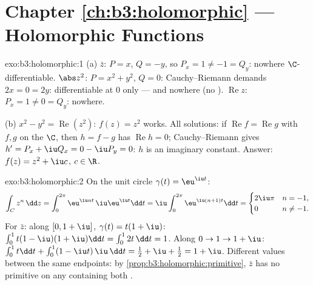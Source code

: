 \section*{Chapter \ref{ch:b3:holomorphic} --- Holomorphic
Functions}

\begin{solution}{exo:b3:holomorphic:1}
(a) $\bar z$: $P = x$, $Q = -y$, so $P_x = 1 \neq -1 = Q_y$:
nowhere $\C$-differentiable. $\abs z^2$: $P = x^2 + y^2$, $Q =
0$: Cauchy--Riemann demands $2x = 0 = 2y$: differentiable at
$0$ only --- and  nowhere (no ).
$\operatorname{Re}z$: $P_x = 1 \neq 0 = Q_y$: nowhere.

(b) $x^2 - y^2 = \operatorname{Re}(z^2)$: $f(z) = z^2$ works.
All solutions: if $\operatorname{Re}f = \operatorname{Re}g$
with $f, g$  on the  $\C$, then $h = f -
g$ has $\operatorname{Re}h = 0$; Cauchy--Riemann gives $h' =
P_x + \iu Q_x = 0 - \iu P_y = 0$: $h$ is an imaginary
constant. Answer: $f(z) = z^2 + \iu c$, $c \in \R$.
\end{solution}

\begin{solution}{exo:b3:holomorphic:2}
On the unit circle $\gamma(t) = \eu^{\iu t}$:
\[
\int_C z^n\,\dd z = \int_0^{2\pi}\eu^{\iu nt}\,\iu\eu^{\iu
t}\dd t = \iu\int_0^{2\pi}\eu^{\iu(n+1)t}\dd t
= \begin{cases} 2\iu\pi & n = -1,\\ 0 & n \neq -1.\end{cases}
\]
For $\bar z$: along $[0, 1+\iu]$, $\gamma(t) = t(1 + \iu)$:
$\int_0^1 t(1 - \iu)(1 + \iu)\dd t = \int_0^12t\,\dd t = 1$.
Along $0 \to 1 \to 1 + \iu$: $\int_0^1t\dd t +
\int_0^1(1 - \iu t)\,\iu\,\dd t = \frac12 + \iu + \frac12 = 1
+ \iu$. Different values between the same endpoints: by
\cref{prop:b3:holomorphic:primitive}, $\bar z$ has no
primitive on any  containing both .
\end{solution}

